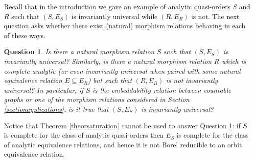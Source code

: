 \documentclass{amsart}
\newtheorem{question}[theorem]{Question}
\theoremstyle{definition}
\theoremstyle{remark}
\begin{document}
Recall that in the  introduction we gave an example of analytic quasi-orders $S$ and $R$ such that $(S,E_S)$ is invariantly universal while $(R,E_R)$ is not. The next question asks whether there exist (natural) morphism relations behaving in each of these ways.

\begin{question}\label{questionfinal}
Is there a natural morphism relation $S$ such that $(S,E_S)$ is invariantly universal? Similarly, is there a natural morphism relation $R$ which is complete analytic (or even invariantly universal when paired with some natural equivalence relation $E \subseteq E_R$) but such that $(R,E_R)$ is \emph{not} invariantly universal? In particular, if $S$ is the embeddability relation between countable graphs or one of the morphism relations considered in Section \ref{sectionapplications}, is it true that $(S,E_S)$ is invariantly universal?
\end{question}

Notice that Theorem \ref{theorsaturation} cannot be used to answer Question \ref{questionfinal}: if $S$ is complete for the class of analytic quasi-orders then $E_S$ is complete for the class of analytic equivalence relations, and hence it is not Borel reducible to an orbit equivalence relation.



\end{document}
